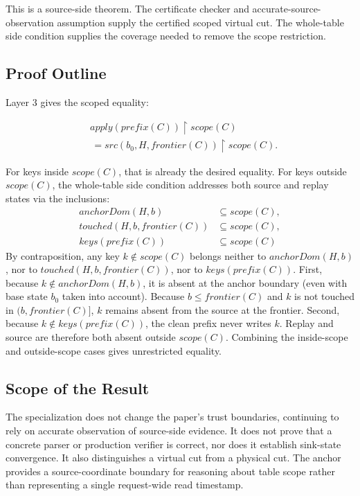 \documentclass[letterpaper,10pt,twocolumn]{article}
\newcommand{\restrict}{\mathbin{\upharpoonright}}
\newcommand{\Apply}{\mathit{apply}}
\newcommand{\Src}{\mathit{src}}
\newcommand{\Scope}{\mathit{scope}}
\newcommand{\Frontier}{\mathit{frontier}}
\newcommand{\CleanPrefix}{\mathit{prefix}}
\newcommand{\AnchorDomain}{\mathit{anchorDom}}
\newcommand{\TouchedBetween}{\mathit{touched}}
\newcommand{\ReplayKeys}{\mathit{keys}}
\begin{document}
This is a source-side theorem. The certificate checker and
accurate-source-observation assumption supply the certified scoped
virtual cut. The whole-table side condition supplies the coverage
needed to remove the scope restriction.

\subsection{Proof Outline}\label{proof-roadmap}

Layer 3 gives the scoped equality:

\[
\begin{aligned}
&\Apply(\CleanPrefix(C)) \restrict \Scope(C)\\
&\,= \Src(b_0,H,\Frontier(C)) \restrict \Scope(C).
\end{aligned}
\]

For keys inside $\Scope(C)$, that is already the desired equality.
For keys outside $\Scope(C)$, the whole-table side condition addresses both
source and replay states via the inclusions:
\[
  \begin{aligned}
    \AnchorDomain(H,b)                &\subseteq \Scope(C), \\
    \TouchedBetween(H,b,\Frontier(C)) &\subseteq \Scope(C), \\
    \ReplayKeys(\CleanPrefix(C))      &\subseteq \Scope(C)
  \end{aligned}
\]
By contraposition, any key $k \notin \Scope(C)$ belongs neither to $\AnchorDomain(H,b)$,
nor to $\TouchedBetween(H,b,\Frontier(C))$, nor to $\ReplayKeys(\CleanPrefix(C))$.
First, because $k \notin \AnchorDomain(H,b)$, it is absent at the anchor
boundary (even with base state $b_0$ taken into account). Because
$b \le \Frontier(C)$ and $k$ is not touched in $(b, \Frontier(C)]$,
$k$ remains absent from the source at the frontier.
Second, because $k \notin \ReplayKeys(\CleanPrefix(C))$, the clean prefix
never writes $k$. Replay and source are therefore both absent outside
$\Scope(C)$. Combining the inside-scope and outside-scope cases gives
unrestricted equality.

\subsection{Scope of the Result}\label{boundaries}

The specialization does not change the paper's trust boundaries,
continuing to rely on accurate observation of source-side evidence. It
does not prove that a concrete parser or production verifier
is correct, nor does it establish sink-state convergence.
It also distinguishes a virtual cut from a physical cut. The anchor provides a
source-coordinate boundary for reasoning about table scope rather than representing a
single request-wide read timestamp.
\end{document}
